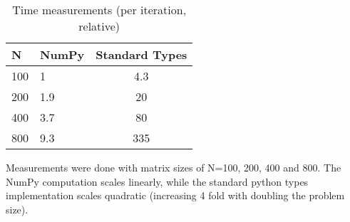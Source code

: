 \documentclass[11pt]{amsart}
\begin{document}
\begin{table}[!hbp]
\begin{tabular}{llc}
\hline
N &  NumPy &  Standard Types \\ 
\hline
100 &  1 &    4.3         \\
200 &  1.9  &   20            \\
400 & 3.7   &   80            \\
800 &  9.3  &    335         \\
\hline
\end{tabular}
\caption{Time measurements (per iteration, relative)}
\end{table}

Measurements were done with matrix sizes of N=100, 200, 400 and 800. 
The NumPy computation scales linearly, while the standard python types implementation scales quadratic (increasing 4 fold with doubling the problem size).
\end{document}

